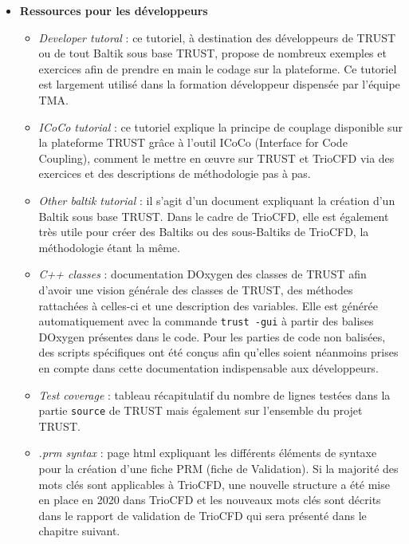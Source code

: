 \begin{itemize}[label=$\Rightarrow$, font=\LARGE]
\begin{itemize}
  \end{itemize}
  \item \textbf{Ressources pour les développeurs}
  \begin{itemize}
    \item \textit{Developer tutoral} : ce tutoriel, à destination des développeurs de TRUST ou de tout Baltik sous base TRUST, propose de nombreux exemples et exercices afin de prendre en main le codage sur la plateforme. Ce tutoriel est largement utilisé dans la formation développeur dispensée par l'équipe TMA.
    \item \textit{ICoCo tutorial} : ce tutoriel explique la principe de couplage disponible sur la plateforme TRUST grâce à l'outil ICoCo (Interface for Code Coupling), comment le mettre en œuvre sur TRUST et TrioCFD via des exercices et des descriptions de méthodologie pas à pas.
    \item \textit{Other baltik tutorial} : il s'agit d'un document expliquant la création d'un Baltik sous base TRUST. Dans le cadre de TrioCFD, elle est également très utile pour créer des Baltiks ou des sous-Baltiks de TrioCFD, la méthodologie étant la même.
    \item \textit{C++ classes} : documentation DOxygen des classes de TRUST afin d'avoir une vision générale des classes de TRUST, des méthodes rattachées à celles-ci et une description des variables. Elle est générée automatiquement avec la commande \texttt{trust -gui} à partir des balises DOxygen présentes dans le code. Pour les parties de code non balisées, des scripts spécifiques ont été conçus afin qu'elles soient néanmoins prises en compte dans cette documentation indispensable aux développeurs.
    \item \textit{Test coverage} : tableau récapitulatif du nombre de lignes testées dans la partie \texttt{source} de TRUST mais également sur l'ensemble du projet TRUST.
    \item \textit{.prm syntax} : page html expliquant les différents éléments de syntaxe pour la création d'une fiche PRM (fiche de Validation). Si la majorité des mots clés sont applicables à TrioCFD, une nouvelle structure a été mise en place en 2020 dans TrioCFD et les nouveaux mots clés sont décrits dans le rapport de validation de TrioCFD qui sera présenté dans le chapitre suivant.
  \end{itemize}
\end{itemize} 
  
  
